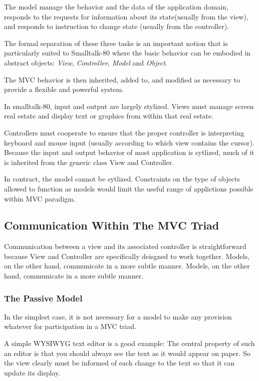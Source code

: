 \documentclass[a4paper, 11pt]{book}
\begin{document}
The model manage the behavior and the data of the application domain, responds
to the requests for information about its state(usually from the view), and
 responds to instruction to change state (usually from the controller).

The formal separation of these three tasks is an important notion that is
particularly suited to Smalltalk-80 where the basic behavior can be embodied in
abstract objects: \emph{View}, \emph{Controller}, \emph{Model} and
\emph{Object}.

The MVC behavior is then inherited, added to, and modified as necessary to
provide a flexible and powerful system.

In smalltalk-80, input and output are largely stylized. Views must manage screen
real estate and display text or graphics from within that real estate.

Controllers must cooperate to ensure that the proper controller is interpreting
keyboard and mouse input (usually according to which view contains the cursor).
Because the input and output behavior of most application is sytlized, much of
it is inherited from the generic class View and Controller.

In contract, the model cannot be sytlized. Constraints on the type of objects 
allowed to function as models would limit the useful range of applictions 
possible within MVC paradigm.

\subsection{Communication Within The MVC Triad}
Communication between a view and its associated controller is straightforward
because View and Controller are specifically deisgned to work together. Models,
on the other hand, communicate in a more subtle manner.  Models, on the other 
hand, communicate in a more subtle manner.

\subsubsection{The Passive Model}
In the simplest case, it is not necessary for a model to make any provision
whatever for participation in a MVC triad. 

A simple WYSIWYG text editor is a good example:
The central property of such an editor is that you should always see the text as
it would appear on paper. So the view clearly must be informed of each change to
the text so that it can update its display. 
\end{document}
